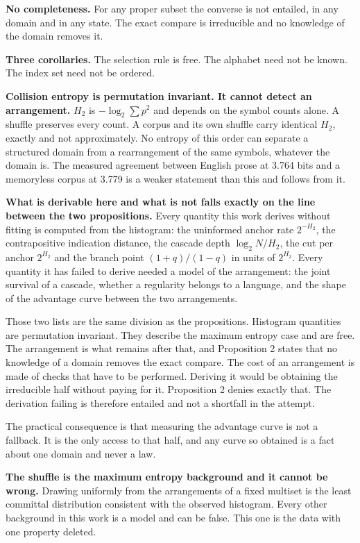 \textbf{No completeness.} For any proper subset the converse is not entailed, in any domain and in any state. The exact compare is irreducible and no knowledge of the domain removes it.

\textbf{Three corollaries.} The selection rule is free. The alphabet need not be known. The index set need not be ordered.

\textbf{Collision entropy is permutation invariant. It cannot detect an arrangement.} \(H_2\) is \(-\log_2 \sum p^2\) and depends on the symbol counts alone. A shuffle preserves every count. A corpus and its own shuffle carry identical \(H_2\), exactly and not approximately. No entropy of this order can separate a structured domain from a rearrangement of the same symbols, whatever the domain is. The measured agreement between English prose at 3.764 bits and a memoryless corpus at 3.779 is a weaker statement than this and follows from it.

\textbf{What is derivable here and what is not falls exactly on the line between the two propositions.} Every quantity this work derives without fitting is computed from the histogram: the uninformed anchor rate \(2^{-H_2}\), the contrapositive indication distance, the cascade depth \(\log_2 N / H_2\), the cut per anchor \(2^{H_2}\) and the branch point \((1+q)/(1-q)\) in units of \(2^{H_2}\). Every quantity it has failed to derive needed a model of the arrangement: the joint survival of a cascade, whether a regularity belongs to a language, and the shape of the advantage curve between the two arrangements.

Those two lists are the same division as the propositions. Histogram quantities are permutation invariant. They describe the maximum entropy case and are free. The arrangement is what remains after that, and Proposition 2 states that no knowledge of a domain removes the exact compare. The cost of an arrangement is made of checks that have to be performed. Deriving it would be obtaining the irreducible half without paying for it. Proposition 2 denies exactly that. The derivation failing is therefore entailed and not a shortfall in the attempt.

The practical consequence is that measuring the advantage curve is not a fallback. It is the only access to that half, and any curve so obtained is a fact about one domain and never a law.

\textbf{The shuffle is the maximum entropy background and it cannot be wrong.} Drawing uniformly from the arrangements of a fixed multiset is the least committal distribution consistent with the observed histogram. Every other background in this work is a model and can be false. This one is the data with one property deleted.

